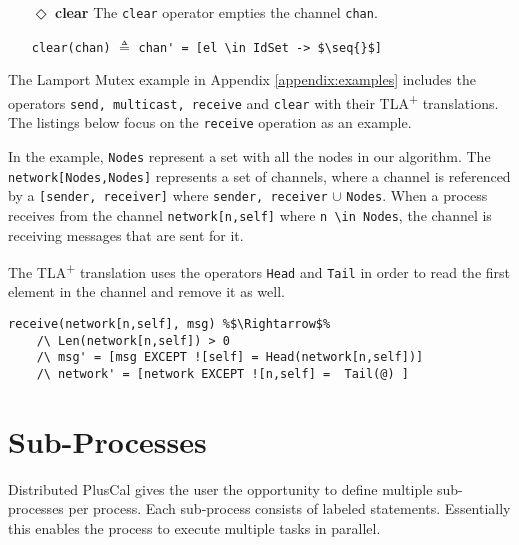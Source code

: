 \documentclass[journal]{IEEEtran}
\newcommand{\tlaplus}{TLA\textsuperscript{+}\xspace}
\newcommand{\seq}[1]{\langle #1 \rangle}
\begin{document}
\begin{itemize}
\begin{lstlisting}[frame = none, numbers = none, escapechar=\%]
receive(chan[element],var) %$\triangleq$%
    /\ Len(chan[element]) > 0 
    /\ var' = [Head(chan[element])]
    /\ chan' = [chan EXCEPT ![element] =  Tail(@) ]
\end{lstlisting}


\item[$\Diamond$]  \textbf{clear}
The \verb|clear| operator empties the channel \verb|chan|.

\begin{center}

\lstinline|clear(chan)| $\triangleq$
\lstinline[mathescape]|chan' = [el \in IdSet -> $\seq{}$]|

\end{center}
\end{itemize}

The Lamport Mutex example in Appendix \ref{appendix:examples} includes the operators \verb|send, multicast, receive| and \verb|clear| with their \tlaplus translations. The listings below focus on the \verb|receive| operation as an example.\newline


In the example, \verb|Nodes| represent a set with all the nodes in our algorithm. The \verb|network[Nodes,Nodes]| represents a set of channels, where a channel is referenced by a \verb|[sender, receiver]| where \verb|sender, receiver| $\cup$ \verb|Nodes|. When a process receives from the channel \verb|network[n,self]| where \verb|n \in Nodes|, the channel is receiving messages that are sent for it.

The \tlaplus translation uses the operators \verb|Head| and \verb|Tail| in order to read the first element in the channel and remove it as well.

\begin{lstlisting}[frame = none, numbers = none, escapechar=\%]
receive(network[n,self], msg) %$\Rightarrow$%
    /\ Len(network[n,self]) > 0 
    /\ msg' = [msg EXCEPT ![self] = Head(network[n,self])]
    /\ network' = [network EXCEPT ![n,self] =  Tail(@) ]
\end{lstlisting}

\section{Sub-Processes}
\label{subProcess}

Distributed PlusCal gives the user the opportunity to define multiple sub-processes per process. Each sub-process consists of labeled statements. Essentially this enables the process to execute multiple tasks in parallel.
\end{document}
